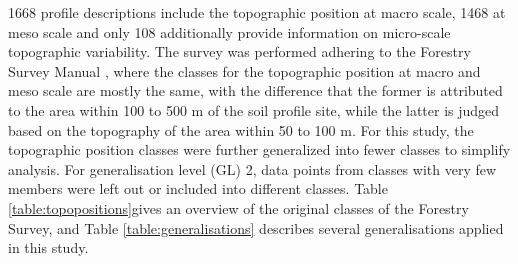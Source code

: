 \documentclass[preprint,12pt,authoryear]{elsarticle}
\begin{document}
1668 profile descriptions include  the topographic position at macro scale, 1468 at meso scale and only 108 additionally provide information on micro-scale topographic variability. The survey was performed adhering to the Forestry Survey Manual \citep{Englisch1998}, where the classes for the topographic position at macro and meso scale are mostly the same, with the difference that the former is attributed to the area within 100 to 500 m of the soil profile site, while the latter is judged based on the topography of the area within 50 to 100 m. For this study, the topographic position classes were further generalized into fewer classes to simplify  analysis. For generalisation level (GL) 2, data points from classes with very few members were left out or included into different classes. Table \ref{table:topopositions}gives an overview of the original classes of the Forestry Survey, and Table \ref{table:generalisations} describes several generalisations applied in this study.
\end{document}
